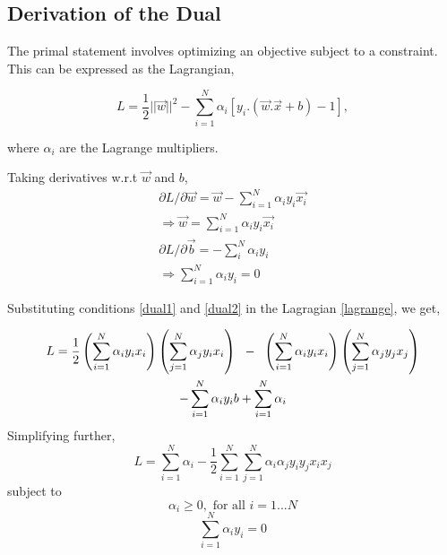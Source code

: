 \documentclass[final,3p,times,twocolumn]{elsarticle}
\begin{document}
\subsection{Derivation of the Dual}
\label{dual}
The primal statement involves optimizing an objective subject to a constraint. This can be expressed as the Lagrangian, 

\begin{equation}
\label{lagrange}
L = \frac{1}{2}||\vec{w}||^2 - \sum_{i=1}^N\alpha_{i}[y_{i}.(\vec{w}.\vec{x} + b) - 1],
\end{equation} 

where $\alpha_{i}$ are the Lagrange multipliers. 

Taking derivatives w.r.t \hspace{1mm} $\vec{w}$ and $b$, 
\begin{gather}
\partial L/\partial \vec{w} = \vec{w} - \sum_{i=1}^N\alpha_{i}y_{i}\vec{x_{i}} \nonumber\\
\label{dual1} \Rightarrow \vec{w} = \sum_{i=1}^N\alpha_{i}y_{i}\vec{x_{i}} \\
\partial L/\partial \vec{b} =  - \sum_{i}^N\alpha_{i}y_{i} \nonumber\\
\label{dual2} \Rightarrow \sum_{i=1}^N\alpha_{i}y_{i} = 0
\end{gather}

Substituting conditions \ref{dual1} and \ref{dual2} in the Lagragian \ref{lagrange}, we get, 

\begin{multline*}
L =  \frac{1}{2}\left(\sum_{i=1}^N\alpha_{i}y_{i}x_{i}\right)
\left(\sum_{j=1}^N\alpha_{j}y_{i}x_{i}\right) \hspace{2mm} - \hspace{2mm} \left(\sum_{i=1}^N\alpha_{i}y_{i}x_{i}\right)
\left(\sum_{j=1}^N\alpha_{j}y_{j}x_{j}\right) \\ 
- \sum_{i=1}^N\alpha_{i}y_{i}b + \sum_{i=1}^N\alpha_{i}
\end{multline*}
Simplifying further, 
\begin{equation}
\label{lagrange2}
L = \sum_{i=1}^N\alpha_{i} - \frac{1}{2}\sum_{i=1}^N\sum_{j=1}^N\alpha_{i}\alpha_{j}y_{i}y_{j}x_{i}x_{j}
\end{equation} subject to 
\begin{equation*}
\alpha_{i} \geqslant 0,  \textrm{ for all }  i = 1...N
\end{equation*}
\begin{equation*}
\sum_{i=1}^N\alpha_{i}y_{i} = 0
\end{equation*}
\end{document}

